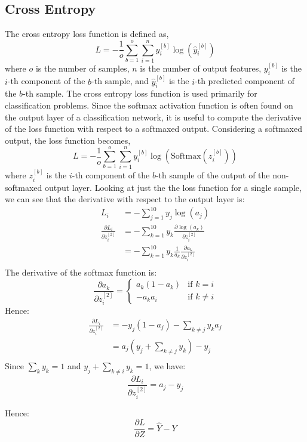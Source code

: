 \documentclass[11pt]{article}
\theoremstyle{definition}
\begin{document}
\subsection{Cross Entropy}
The cross entropy loss function is defined as,
\begin{equation}
    L = -\frac{1}{o} \sum_{b=1}^{o} \sum_{i=1}^{n} y_{i}^{[b]} \log(\hat{y}_{i}^{[b]})
\end{equation}
where $o$ is the number of samples, $n$ is the number of output features, $y_{i}^{[b]}$
is the $i$-th component of the $b$-th sample, and $\hat{y}_{i}^{[b]}$ is the $i$-th 
predicted component of the $b$-th sample. The cross entropy loss function is used
primarily for classification problems. Since the softmax activation function is often
found on the output layer of a classification network, it is useful to compute the 
derivative of the loss function with respect to a softmaxed output. Considering 
a softmaxed output, the loss function becomes,
\begin{equation}
    L = -\frac{1}{o}\sum_{b=1}^{o}\sum_{i=1}^{n}y_{i}^{[b]}\log(\text{Softmax}(z^{[b]}_{i}))
\end{equation}
where $z^{[b]}_{i}$ is the $i$-th component of the $b$-th sample of the output of the
non-softmaxed output layer.
Looking at just the the loss function for a single sample, we can see that the 
derivative with respect to the output layer is:
\begin{align*}
    L_{i} &= -\sum_{j=1}^{10}y_{j}\log(a_{j}) \\
    \frac{\partial L_{i}}{\partial z^{[2]}_{i}} &= - \sum_{k=1}^{10}y_{k}\frac{\partial
        \log(a_{k})}{\partial z^{[2]}_{i}} \\
    &= - \sum_{k=1}^{10}y_{k}\frac{1}{a_{k}}\frac{\partial a_{k}}{\partial z^{[2]}_{i}} \\
\end{align*}
The derivative of the softmax function is:
\begin{equation}
    \frac{\partial a_{k}}{\partial z^{[2]}_{i}} = \begin{cases}
        a_{k}(1-a_{k}) & \text{if } k = i \\
        -a_{k}a_{i} & \text{if } k \neq i
    \end{cases}
\end{equation}
Hence:
\begin{align*}
    \frac{\partial L_{i}}{\partial z^{[2]}_{i}} &= -y_{j}(1-a_{j}) - \sum_{k \neq j}y_{k}a_{j}\\
                                                &= a_{j} \left( y_{j} + \sum_{k \neq j}y_{k} \right) - y_{j} \\
\end{align*}
Since $\sum_{k}y_{k} = 1$ and $y_{j} + \sum_{k \neq i}y_{k} = 1$, we have:
\begin{equation}
    \frac{\partial L_
    {i}}{\partial z^{[2]}_{i}} = a_{j} - y_{j}
\end{equation}

Hence:
\begin{equation}
    \frac{\partial L}{\partial 
    Z} = \hat{Y} - Y
\end{equation}
\end{document}
